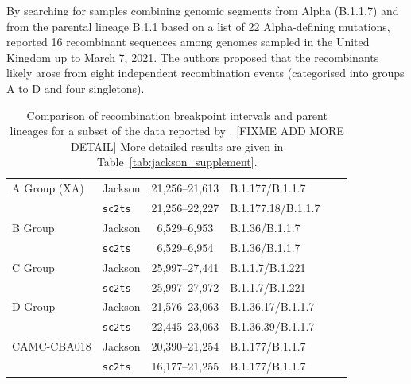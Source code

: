 \documentclass{article}
\begin{document}
By searching for samples combining genomic segments from Alpha (B.1.1.7) and
from the parental lineage B.1.1 based on a list of 22 Alpha-defining mutations,
\citet{Jackson2021-ik} reported 16 recombinant sequences among genomes sampled
in the United Kingdom up to March 7, 2021. The authors proposed that the
recombinants likely arose from eight independent recombination events
(categorised into groups A to D and four singletons).


\begin{table} \centering
\begin{tabular}{ll|clll}
\toprule
A Group (XA) & Jackson        &  21,256–21,613 & B.1.177/B.1.1.7 \\
             & \texttt{sc2ts} &  21,256--22,227 & B.1.177.18/B.1.1.7 \\
\midrule
B Group & Jackson        &  6,529--6,953 & B.1.36/B.1.1.7  \\
        & \texttt{sc2ts} &  6,529--6,954 & B.1.36/B.1.1.7  \\
\midrule
C Group & Jackson        &  25,997--27,441 &  B.1.1.7/B.1.221 \\
        & \texttt{sc2ts} &  25,997--27,972 &  B.1.1.7/B.1.221 \\
\midrule
D Group & Jackson        &  21,576--23,063 &  B.1.36.17/B.1.1.7 \\
        & \texttt{sc2ts} &  22,445--23,063 &  B.1.36.39/B.1.1.7 \\
\midrule
CAMC-CBA018 & Jackson        &  20,390--21,254 & B.1.177/B.1.1.7 \\
            & \texttt{sc2ts} &  16,177--21,255 & B.1.177/B.1.1.7 \\
\midrule
\end{tabular}
\caption{\label{tab:jackson}Comparison of recombination breakpoint intervals and parent lineages for a subset of the data reported by \cite{Jackson2021-ik}. [FIXME ADD MORE DETAIL] More detailed results are given in Table~\ref{tab:jackson_supplement}.}
\end{table}
\end{document}
